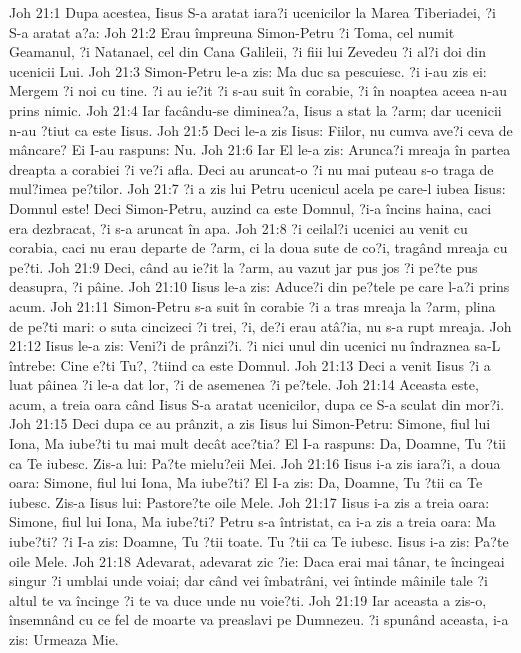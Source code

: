 Joh 21:1  Dupa acestea, Iisus S-a aratat iara?i ucenicilor la Marea Tiberiadei, ?i S-a aratat a?a:
Joh 21:2  Erau împreuna Simon-Petru ?i Toma, cel numit Geamanul, ?i Natanael, cel din Cana Galileii, ?i fiii lui Zevedeu ?i al?i doi din ucenicii Lui.
Joh 21:3  Simon-Petru le-a zis: Ma duc sa pescuiesc. ?i i-au zis ei: Mergem ?i noi cu tine. ?i au ie?it ?i s-au suit în corabie, ?i în noaptea aceea n-au prins nimic.
Joh 21:4  Iar facându-se diminea?a, Iisus a stat la ?arm; dar ucenicii n-au ?tiut ca este Iisus.
Joh 21:5  Deci le-a zis Iisus: Fiilor, nu cumva ave?i ceva de mâncare? Ei I-au raspuns: Nu.
Joh 21:6  Iar El le-a zis: Arunca?i mreaja în partea dreapta a corabiei ?i ve?i afla. Deci au aruncat-o ?i nu mai puteau s-o traga de mul?imea pe?tilor.
Joh 21:7  ?i a zis lui Petru ucenicul acela pe care-l iubea Iisus: Domnul este! Deci Simon-Petru, auzind ca este Domnul, ?i-a încins haina, caci era dezbracat, ?i s-a aruncat în apa.
Joh 21:8  ?i ceilal?i ucenici au venit cu corabia, caci nu erau departe de ?arm, ci la doua sute de co?i, tragând mreaja cu pe?ti.
Joh 21:9  Deci, când au ie?it la ?arm, au vazut jar pus jos ?i pe?te pus deasupra, ?i pâine.
Joh 21:10  Iisus le-a zis: Aduce?i din pe?tele pe care l-a?i prins acum.
Joh 21:11  Simon-Petru s-a suit în corabie ?i a tras mreaja la ?arm, plina de pe?ti mari: o suta cincizeci ?i trei, ?i, de?i erau atâ?ia, nu s-a rupt mreaja.
Joh 21:12  Iisus le-a zis: Veni?i de prânzi?i. ?i nici unul din ucenici nu îndraznea sa-L întrebe: Cine e?ti Tu?, ?tiind ca este Domnul.
Joh 21:13  Deci a venit Iisus ?i a luat pâinea ?i le-a dat lor, ?i de asemenea ?i pe?tele.
Joh 21:14  Aceasta este, acum, a treia oara când Iisus S-a aratat ucenicilor, dupa ce S-a sculat din mor?i.
Joh 21:15  Deci dupa ce au prânzit, a zis Iisus lui Simon-Petru: Simone, fiul lui Iona, Ma iube?ti tu mai mult decât ace?tia? El I-a raspuns: Da, Doamne, Tu ?tii ca Te iubesc. Zis-a lui: Pa?te mielu?eii Mei.
Joh 21:16  Iisus i-a zis iara?i, a doua oara: Simone, fiul lui Iona, Ma iube?ti? El I-a zis: Da, Doamne, Tu ?tii ca Te iubesc. Zis-a Iisus lui: Pastore?te oile Mele.
Joh 21:17  Iisus i-a zis a treia oara: Simone, fiul lui Iona, Ma iube?ti? Petru s-a întristat, ca i-a zis a treia oara: Ma iube?ti? ?i I-a zis: Doamne, Tu ?tii toate. Tu ?tii ca Te iubesc. Iisus i-a zis: Pa?te oile Mele.
Joh 21:18  Adevarat, adevarat zic ?ie: Daca erai mai tânar, te încingeai singur ?i umblai unde voiai; dar când vei îmbatrâni, vei întinde mâinile tale ?i altul te va încinge ?i te va duce unde nu voie?ti.
Joh 21:19  Iar aceasta a zis-o, însemnând cu ce fel de moarte va preaslavi pe Dumnezeu. ?i spunând aceasta, i-a zis: Urmeaza Mie.
